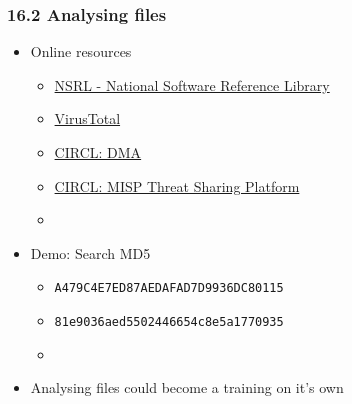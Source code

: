 \begin{frame}[fragile]
  \frametitle{16.2 Analysing files}
    \begin{itemize}
       \item Online resources
            \begin{itemize}
                \item[] \href{https://www.nist.gov/software-quality-group/national-software-reference-library-nsrl}{NSRL - National Software Reference Library}
                \item[] \href{https://www.virustotal.com/}{VirusTotal}
                \item[] \href{https://www.circl.lu/services/dynamic-malware-analysis/}{CIRCL: DMA}
                \item[] \href{https://www.circl.lu/services/misp-malware-information-sharing-platform/}{CIRCL: MISP Threat Sharing Platform}
                \item[]
            \end{itemize}
       \item Demo: Search MD5
            \begin{itemize}
                \item[] \texttt{A479C4E7ED87AEDAFAD7D9936DC80115}
                \item[] \texttt{81e9036aed5502446654c8e5a1770935}
                \item[] 
            \end{itemize}
       \item Analysing files could become a training on it's own
    \end{itemize}
\end{frame}




